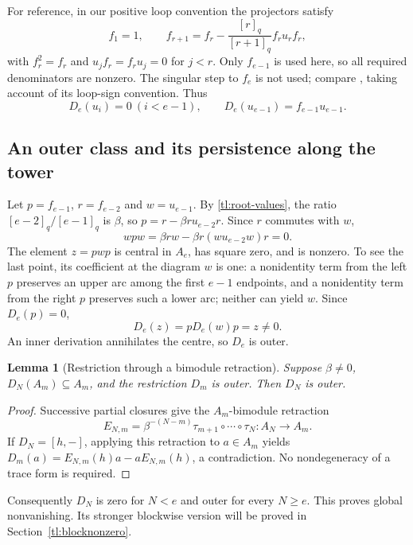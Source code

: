 \documentclass[a4paper,11pt,oneside,reqno]{amsart}
\newtheorem{lemma}[theorem]{Lemma}
\theoremstyle{definition}
\numberwithin{equation}{section}
\begin{document}
	For reference, in our positive loop convention the projectors satisfy
	\begin{equation}\label{tl:JW}
		f_1=1,\qquad
		f_{r+1}=f_r-\frac{[r]_q}{[r+1]_q}f_ru_rf_r,
	\end{equation}
	with $f_r^2=f_r$ and $u_jf_r=f_ru_j=0$ for $j<r$.
	Only $f_{e-1}$ is used here, so all required denominators are
	nonzero.  The singular step to $f_e$ is not used; compare
	\cite{Morrison}, taking account of its loop-sign convention.
	Thus
	\[
	D_e(u_i)=0\ (i<e-1),\qquad
	D_e(u_{e-1})=f_{e-1}u_{e-1}.
	\]
	
	\subsection{An outer class and its persistence along the tower}
	Let $p=f_{e-1}$, $r=f_{e-2}$ and $w=u_{e-1}$.  By
	\eqref{tl:root-values}, the ratio $[e-2]_q/[e-1]_q$ is $\beta$,
	so $p=r-\beta ru_{e-2}r$.  Since $r$ commutes with $w$,
	\[
	wpw=\beta rw-\beta r(wu_{e-2}w)r=0.
	\]
	The element $z=pwp$ is central in $A_e$, has square zero, and is
	nonzero.  To see the last point, its coefficient at the diagram $w$
	is one: a nonidentity term from the left $p$ preserves an upper arc
	among the first $e-1$ endpoints, and a nonidentity term from the right
	$p$ preserves such a lower arc; neither can yield $w$.
	Since $D_e(p)=0$,
	\begin{equation}\label{tl:initial-witness}
		D_e(z)=pD_e(w)p=z\ne0.
	\end{equation}
	An inner derivation annihilates the centre, so $D_e$ is outer.
	
	\begin{lemma}[Restriction through a bimodule retraction]\label{tl:outer-retraction}
		Suppose $\beta\ne0$, $D_N(A_m)\subseteq A_m$, and the restriction
		$D_m$ is outer.  Then $D_N$ is outer.
	\end{lemma}
	\begin{proof}
		Successive partial closures give the $A_m$-bimodule retraction
		\[
		E_{N,m}=\beta^{-(N-m)}\tau_{m+1}\circ\cdots\circ\tau_N:A_N\to A_m.
		\]
		If $D_N=[h,-]$, applying this retraction to $a\in A_m$ yields
		$D_m(a)=E_{N,m}(h)a-aE_{N,m}(h)$, a contradiction.
		No nondegeneracy of a trace form is required.
	\end{proof}
	
	Consequently $D_N$ is zero for $N<e$ and outer for every $N\ge e$.
	This proves global nonvanishing.  Its stronger blockwise version will
	be proved in Section~\ref{tl:blocknonzero}.
	
\end{document}

